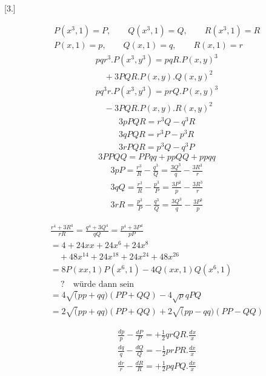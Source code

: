 \begingroup
\renewcommand{\arraystretch}{1.45}

\par\medskip{}\centerline{[3.]}\nobreak\smallskip
\[
\begin{gathered}
P(x^3,1)=P,\qquad Q(x^3,1)=Q,\qquad R(x^3,1)=R\\[8pt]
P(x,1)=p,\qquad Q(x,1)=q,\qquad R(x,1)=r
\end{gathered}
\]
\[
\begin{gathered}
pqr^3.P(x^3,y^3)=pqR.P(x,y)^3\\[8pt]\quad{}+3PQR.P(x,y).Q(x,y)^2\\[8pt]
pq^3r.P(x^3,y^3)=prQ.P(x,y)^3\\[8pt]\quad{}-3PQR.P(x,y).R(x,y)^2
\end{gathered}
\]
\[
\begin{gathered}
3pPQR=r^3Q-q^3R\\[8pt]
3qPQR=r^3P-p^3R\\[8pt]
3rPQR=p^3Q-q^3P
\end{gathered}
\]
\[
3PPQQ=PPqq+ppQQ+ppqq
\]
\[
\begin{gathered}
3pP=\frac{r^3}{R}-\frac{q^3}{Q}=\frac{3Q^3}{q}-\frac{3R^3}{r}\\[8pt]
3qQ=\frac{r^3}{R}-\frac{p^3}{P}=\frac{3P^3}{p}-\frac{3R^3}{r}\\[8pt]
3rR=\frac{p^3}{P}-\frac{q^3}{Q}=\frac{3Q^3}{q}-\frac{3P^3}{p}
\end{gathered}
\]

\[
\begin{gathered}
\frac{r^4+3R^4}{rR}=\frac{q^4+3Q^4}{qQ}=\frac{p^4+3P^4}{pP}\\[8pt]
=4+24xx+24x^6+24x^8\\[8pt]\quad{}+48x^{14}+24x^{18}+24x^{24}+48x^{26}\\[8pt]
=8P(xx,1)P(x^6,1)-4Q(xx,1)Q(x^6,1)\\[8pt]\quad{}\ ?\quad\text{würde dann sein}\\[8pt]
=4\surd(pp+qq)(PP+QQ)-4\surd pqPQ\\[8pt]
=2\surd(pp+qq)(PP+QQ)+2\surd(pp-qq)(PP-QQ)
\end{gathered}
\]





\[
\begin{gathered}
\frac{dp}{p}-\frac{dP}{P}=+\tfrac12qrQR.\frac{dx}{x}\\[8pt]
\frac{dq}{q}-\frac{dQ}{Q}=-\tfrac12prPR.\frac{dx}{x}\\[8pt]
\frac{dr}{r}-\frac{dR}{R}=+\tfrac12pqPQ.\frac{dx}{x}
\end{gathered}
\]



